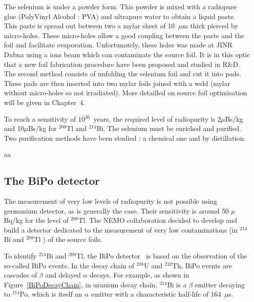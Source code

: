 \documentclass[main.tex]{subfiles}
\begin{document}
\NI The selenium is under a powder form. This powder is mixed with a radiopure glue (PolyVinyl Alcohol : PVA) and ultrapure water to obtain a liquid paste. This paste is spread out between two a mylar sheet of 10~$\mu$m thick pierced by micro-holes. These micro-holes allow a good coupling between the paste and the foil and facilitate evaporation. Unfortunately, these holes was made at JINR Dubna using a ions beam which can contaminate the source foil. It is in this optic that a new foil fabrication procedure have been proposed and studied in R\&D. The second method consists of unfolding the selenium foil and cut it into pads. These pads are then inserted into two mylar foils joined with a weld (mylar without micro-holes so not irradiated). More detailled on source foil optimisation will be given in Chapter~4.


\bigskip


\NI To reach a sensitivity of 10$^{\text{26}}$~years, the required level of radiopurity is 2$\mu$Bs/kg and 10$\mu$Bs/kg for $^{\text{208}}$Tl and $^{\text{214}}$Bi. The selenium must be enriched and purified. Two purification methods have been studied  : a chemical one and by distillation. 

\ifx
aa
\fi

\FloatBarrier


\subsection{The BiPo detector}


\NI The measurement of very low levels of radiopurity is not possible using germanium detector, as is generally the case. Their sensitivity is around 50 $\mu$Bq/kg for the level of $^{\text{208}}$Tl. The NEMO collaboration decided to develop and build a detector dedicated to the measurement of very low contaminations (in $^{\text{214}}$Bi and $^{\text{208}}$Tl ) of the source foils.


\bigskip  


\NI To identify $^{\text{214}}$Bi and $^{\text{208}}$Tl, the BiPo detector~\cite{BiPoDetector} is based on the observation of the so-called BiPo events. In the decay chain of $^{\text{238}}$U and $^{\text{232}}$Th, BiPo events are cascades of $\beta$ and delayed $\alpha$ decays. For example, as shown in Figure~\ref{BiPoDecayChain}, in uranium decay chain, $^{\text{214}}$Bi is a $\beta$ emitter decaying to $^{\text{214}}$Po, which is itself an $\alpha$ emitter with a characteristic half-life of 164~$\mu$s.
\end{document}
